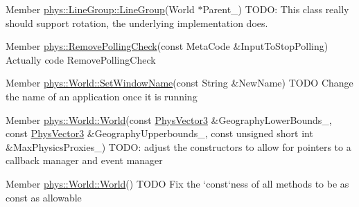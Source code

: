 \label{dd/da0/todo__todo000009}
\hypertarget{dd/da0/todo__todo000009}{}
 
\begin{DoxyDescription}
\item[Member \hyperlink{classphys_1_1LineGroup_a676039a6beec56d24c631e9da5fd7e76}{phys::LineGroup::LineGroup}(World $\ast$Parent\_\-) ]TODO: This class really should support rotation, the underlying implementation does. 
\end{DoxyDescription}

\label{dd/da0/todo__todo000005}
\hypertarget{dd/da0/todo__todo000005}{}
 
\begin{DoxyDescription}
\item[Member \hyperlink{namespacephys_a49d077eb58030fdb50229c55bc09a03d}{phys::RemovePollingCheck}(const MetaCode \&InputToStopPolling) ]Actually code RemovePollingCheck 
\end{DoxyDescription}

\label{dd/da0/todo__todo000023}
\hypertarget{dd/da0/todo__todo000023}{}
 
\begin{DoxyDescription}
\item[Member \hyperlink{classphys_1_1World_acd0dff342c08fe3008226488b7c53d97}{phys::World::SetWindowName}(const String \&NewName) ]TODO Change the name of an application once it is running 
\end{DoxyDescription}

\label{dd/da0/todo__todo000019}
\hypertarget{dd/da0/todo__todo000019}{}
 
\begin{DoxyDescription}
\item[Member \hyperlink{classphys_1_1World_a1f020a5a49a3bbfca6d570db44e72beb}{phys::World::World}(const \hyperlink{classPhysVector3}{PhysVector3} \&GeographyLowerBounds\_\-, const \hyperlink{classPhysVector3}{PhysVector3} \&GeographyUpperbounds\_\-, const unsigned short int \&MaxPhysicsProxies\_\-=1024) ]TODO: adjust the constructors to allow for pointers to a callback manager and event manager 
\end{DoxyDescription}

\label{dd/da0/todo__todo000018}
\hypertarget{dd/da0/todo__todo000018}{}
 
\begin{DoxyDescription}
\item[Member \hyperlink{classphys_1_1World_a7f762724406c874250c3dc8910a1e695}{phys::World::World}() ]TODO Fix the `const`ness of all methods to be as const as allowable 
\end{DoxyDescription}